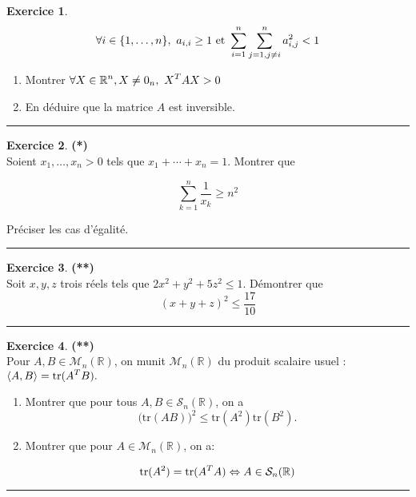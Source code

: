 \documentclass[a4paper,11pt]{article}
\theoremstyle{definition}
\newtheorem{exo}{Exercice} %
\begin{document}
\begin{minipage}{1\linewidth}
\begin{minipage}[t]{0.48\linewidth}
\begin{exo}
			$$\displaystyle 
			\forall i \in\{1, \ldots, n\},\  a_{i, i} \geq 1 \text { et } \sum_{i=1}^{n} \sum_{j=1, j \neq i}^{n} a_{i, j}^{2}<1
			$$
			\begin{enumerate}
				\item Montrer $\displaystyle\forall X \in \mathbb{R}^{n}, X\neq 0_n, \  X^{T} A X > 0$
				\item En déduire que la matrice $A$ est inversible.
			\end{enumerate}
			
			\centering\rule{1\linewidth}{0.6pt}\end{exo}
		
		\begin{exo}\textbf{(*)}\quad\\[0.2cm]
			
			Soient $x_{1}, \ldots, x_{n}>0$ tels que $x_{1}+\cdots+x_{n}=1$. Montrer que
			
			$$
			\sum_{k=1}^{n} \frac{1}{x_{k}} \geq n^{2}
			$$
			
			Préciser les cas d'égalité.
			
			
			\centering\rule{1\linewidth}{0.6pt}\end{exo}
			
		
			\begin{exo}\textbf{(**)}\quad\\[0.2cm]
			Soit $x,y,z$ trois réels tels que $2x^2+y^2+5z^2\leq 1$. Démontrer que $$(x+y+z)^2\leq\frac {17}{10}$$
			
			\centering\rule{1\linewidth}{0.6pt}\end{exo}
			
			\begin{exo}\textbf{(**)}\quad\\[0.2cm]
			Pour $A,B\in\mathcal M_n(\mathbb R)$, on munit $\mathcal M_n(\mathbb R)$ du produit scalaire usuel : $ \displaystyle \langle A,B\rangle=\textrm{tr}(A^T B).$
			\begin{enumerate}
				\item Montrer que pour tous $A,B\in\mathcal S_n(\mathbb R)$, on a
				$$\big(\textrm{tr}(AB)\big)^2\leq \textrm{tr}(A^2)\textrm{tr}(B^2).$$
				\item Montrer que pour $A\in \mathcal M_n(\mathbb R)$, on a:
				
				$$\textrm{tr}(A^2) = \textrm{tr}(A^TA)  \Leftrightarrow A\in\mathcal S_n(\mathbb R)$$
			\end{enumerate}	
	
	        \centering\rule{1\linewidth}{0.6pt}\end{exo}

		
\end{minipage}\end{minipage}\newpage
\end{document}
